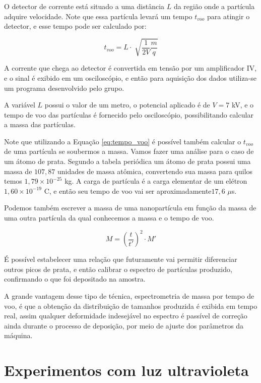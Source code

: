 O detector de corrente está situado a uma distância $L$ da região onde a partícula adquire velocidade. Note que essa partícula levará um tempo $t_{voo}$ para atingir o detector, e esse tempo pode ser calculado por:

\begin{equation}
\label{eq:tempo_voo}
t_{voo} = L \cdot \sqrt[]{\frac{1}{2V} \frac{m}{q}} 
\end{equation}


A corrente que chega ao detector é convertida em tensão por um amplificador IV, e o sinal é exibido em um osciloscópio, e então para aquisição dos dados utiliza-se um programa desenvolvido pelo grupo.

A variável $L$ possui o valor de um metro, o potencial aplicado é de $V = 7 $  kV, e o tempo de voo das partículas é fornecido pelo osciloscópio, possibilitando calcular a massa das partículas.

Note que utilizando a Equação \ref{eq:tempo_voo} é possível também calcular o $t_{voo}$ de uma partícula se soubermos a massa. Vamos fazer uma análise para o caso de um átomo de prata. Segundo a tabela periódica um átomo de prata possui uma massa de $107,87$ unidades de massa atômica, convertendo sua massa para quilos temos $1,79\times 10^{-25}$ kg. A carga de partícula é a carga elementar de um elétron $1,60\times 10^{-19}$ C, e então seu tempo de voo vai ser aproximadamente$17,6$ $\mu$s.

Podemos também escrever a massa de uma nanopartícula em função da massa de uma outra partícula da qual conhecemos a massa e o tempo de voo.

\begin{equation}
\label{eq:relacao_massa_tempo}
M = \left(\frac{t}{t'}\right)^2 \cdot M'
\end{equation}


É possível estabelecer uma relação que futuramente vai permitir diferenciar outros picos de prata, e então calibrar o espectro de partículas produzido, confirmando o que foi depositado na amostra.


A grande vantagem desse tipo de técnica, espectrometria de massa por tempo de voo, é que a obtenção da distribuição de tamanhos produzida é exibida em tempo real, assim qualquer deformidade indesejável no espectro é passível de correção ainda durante o processo de deposição, por meio de ajuste  dos parâmetros da máquina. 

\section{Experimentos com luz ultravioleta}

